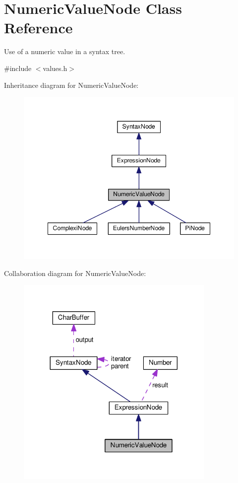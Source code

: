 \hypertarget{classNumericValueNode}{}\section{Numeric\+Value\+Node Class Reference}
\label{classNumericValueNode}


Use of a numeric value in a syntax tree.  




{\ttfamily \#include $<$values.\+h$>$}



Inheritance diagram for Numeric\+Value\+Node\+:
\nopagebreak
\begin{figure}[H]
\begin{center}
\leavevmode
\includegraphics[width=348pt]{d9/dd5/classNumericValueNode__inherit__graph}
\end{center}
\end{figure}


Collaboration diagram for Numeric\+Value\+Node\+:
\nopagebreak
\begin{figure}[H]
\begin{center}
\leavevmode
\includegraphics[width=272pt]{d5/d7d/classNumericValueNode__coll__graph}
\end{center}
\end{figure}
